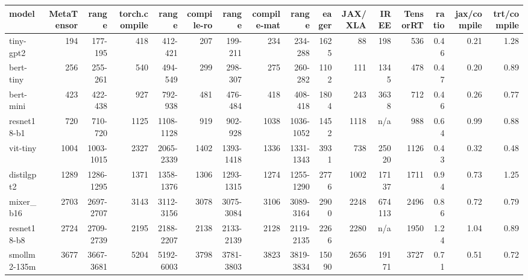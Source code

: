 \begin{tabular}{lrrrrrrrrrrrrrrr}
\toprule
model & MetaTensor & range & torch.compile & range & compile-ro & range & compile-mat & range & eager & JAX/XLA & IREE & TensorRT & ratio & jax/compile & trt/compile \\
\midrule
tiny-gpt2 & 194 & 177-195 & 418 & 412-421 & 207 & 199-211 & 234 & 234-288 & 1625 & 88 & 198 & 536 & 0.46 & 0.21 & 1.28 \\
bert-tiny & 256 & 255-261 & 540 & 494-549 & 299 & 298-307 & 275 & 260-282 & 1102 & 111 & 1345 & 478 & 0.47 & 0.20 & 0.89 \\
bert-mini & 423 & 422-438 & 927 & 792-938 & 481 & 476-484 & 418 & 408-418 & 1804 & 243 & 3638 & 712 & 0.46 & 0.26 & 0.77 \\
resnet18-b1 & 720 & 710-720 & 1125 & 1108-1128 & 919 & 902-928 & 1038 & 1036-1052 & 1452 & 1118 & n/a & 988 & 0.64 & 0.99 & 0.88 \\
vit-tiny & 1004 & 1003-1015 & 2327 & 2065-2339 & 1402 & 1393-1418 & 1336 & 1331-1343 & 3931 & 738 & 25020 & 1126 & 0.43 & 0.32 & 0.48 \\
distilgpt2 & 1289 & 1286-1295 & 1371 & 1358-1376 & 1306 & 1293-1315 & 1274 & 1255-1290 & 2776 & 1002 & 17137 & 1711 & 0.94 & 0.73 & 1.25 \\
mixer\_b16 & 2703 & 2697-2707 & 3143 & 3112-3156 & 3078 & 3075-3084 & 3106 & 3089-3164 & 2900 & 2248 & 674113 & 2496 & 0.86 & 0.72 & 0.79 \\
resnet18-b8 & 2724 & 2709-2739 & 2195 & 2188-2207 & 2138 & 2133-2139 & 2128 & 2119-2135 & 2266 & 2280 & n/a & 1950 & 1.24 & 1.04 & 0.89 \\
smollm2-135m & 3677 & 3667-3681 & 5204 & 5192-6003 & 3798 & 3781-3803 & 3823 & 3819-3834 & 15090 & 2656 & 19171 & 3727 & 0.71 & 0.51 & 0.72 \\
\bottomrule
\end{tabular}
